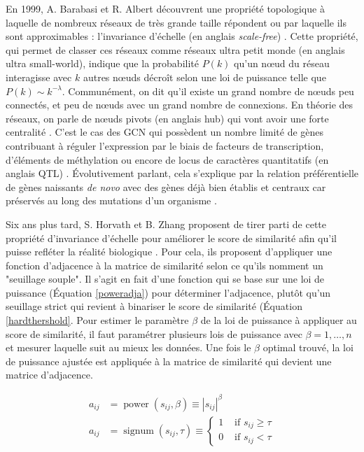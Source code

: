 En 1999, A. Barabasi et R. Albert découvrent une propriété topologique à laquelle de nombreux réseaux de très grande taille répondent ou par laquelle ils sont approximables \cite{Broido2019Mar} : l'invariance d'échelle (en anglais \textit{scale-free}) \cite{Barabasi1999Oct}. Cette propriété, qui permet de classer ces réseaux comme réseaux ultra petit monde \cite{Cohen2003Feb} (en anglais ultra small-world), indique que la probabilité $P(k)$ qu'un nœud du réseau interagisse avec $k$ autres nœuds décroît selon une loi de puissance telle que $P(k) \sim k^{-\lambda}$. Communément, on dit qu'il existe un grand nombre de nœuds peu connectés, et peu de nœuds avec un grand nombre de connexions. En théorie des réseaux, on parle de nœuds pivots (en anglais hub) qui vont avoir une forte centralité \cite{VanDam2018}. C'est le cas des \acrshort{GCN} qui possèdent un nombre limité de gènes contribuant à réguler l'expression par le biais de facteurs de transcription, d'éléments de méthylation ou encore de locus de caractères quantitatifs (en anglais \acrfull{QTL}) \cite{Serin2016}. Évolutivement parlant, cela s'explique par la relation préférentielle de gènes naissants \textit{de novo} avec des gènes déjà bien établis et centraux car préservés au long des mutations d'un organisme \cite{Barabasi2004}.


Six ans plus tard, S. Horvath et B. Zhang proposent de tirer parti de cette propriété d'invariance d'échelle pour améliorer le score de similarité afin qu'il puisse refléter la réalité biologique \cite{Zhang2005a}. Pour cela, ils proposent d'appliquer une fonction d'adjacence à la matrice de similarité selon ce qu'ils nomment un "seuillage souple". Il s'agit en fait d'une fonction qui se base sur une loi de puissance (Équation \ref{poweradja}) pour déterminer l'adjacence, plutôt qu'un seuillage strict qui revient à binariser le score de similarité (Équation \ref{hardthershold}. Pour estimer le paramètre $\beta$ de la loi de puissance à appliquer au score de similarité, il faut paramétrer plusieurs lois de puissance avec $\beta = 1, …, n$ et mesurer laquelle suit au mieux les données. Une fois le $\beta$ optimal trouvé, la loi de puissance ajustée est appliquée à la matrice de similarité qui devient une matrice d'adjacence. 

\begin{align} 
    a_{i j} &= \operatorname{power}\left(s_{i j}, \beta\right) \equiv\left|s_{i j}\right|^{\beta} \label{poweradja} \\
    a_{i j} &= \operatorname{signum}\left(s_{i j}, \tau\right) \equiv \begin{cases}1 & \text { if } s_{i j} \geq \tau \\ 0 & \text { if } s_{i j}<\tau\end{cases} \label{hardthershold}
\end{align}


